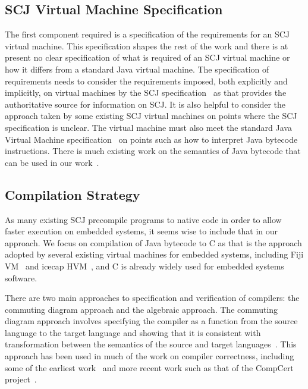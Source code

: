 \subsection{SCJ Virtual Machine Specification}

The first component required is a specification of the requirements
for an SCJ virtual machine.
This specification shapes the rest of the work and there is at present
no clear specification of what is required of an SCJ virtual machine
or how it differs from a standard Java virtual machine.
The specification of requirements needs to consider the requirements
imposed, both explicitly and implicitly, on virtual machines by the
SCJ specification~\cite{locke2013} as that provides the authoritative
source for information on SCJ.
It is also helpful to consider the approach taken by some existing SCJ
virtual machines on points where the SCJ specification is unclear.
The virtual machine must also meet the standard Java Virtual Machine
specification~\cite{lindholm2014} on points such as how to interpret
Java bytecode instructions.
There is much existing work on the semantics of Java bytecode that can
be used in our work~\cite{bertelsen2000, jones1998, stark2001}.

\subsection{Compilation Strategy}

As many existing SCJ  precompile programs to native code in order to allow
faster execution on embedded systems, it seems wise to include that in
our approach.
We focus on compilation of Java bytecode to C as that is the approach
adopted by several existing virtual machines for embedded systems,
including Fiji VM~\cite{pizlo2009} and icecap
HVM~\cite{sondergaard2012}, and C is already widely used for embedded
systems software.

There are two main approaches to specification and verification of
compilers: the commuting diagram approach and the algebraic approach.
The commuting diagram approach involves specifying the compiler as a
function from the source language to the target language and showing
that it is consistent with transformation between the semantics of the
source and target languages~\cite{morris1973, thatcher1979}.
This approach has been used in much of the work on compiler
correctness, including some of the earliest work~\cite{mccarthy1967}
and more recent work such as that of the CompCert project~\cite{leroy2009a,
  leroy2009b}.

